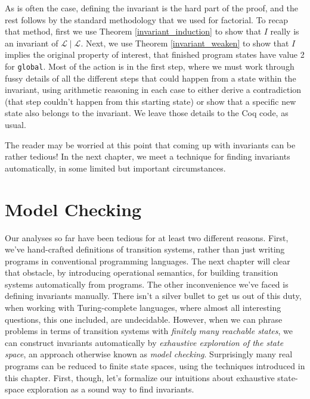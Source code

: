 \documentclass{amsbook}
\theoremstyle{definition}
\theoremstyle{remark}
\numberwithin{section}{chapter}
\numberwithin{equation}{chapter}
\begin{document}
As is often the case, defining the invariant is the hard part of the proof, and the rest follows by the standard methodology that we used for factorial.
To recap that method, first we use Theorem \ref{invariant_induction} to show that $I$ really is an invariant of $\mathcal L \mid \mathcal L$.
Next, we use Theorem \ref{invariant_weaken} to show that $I$ implies the original property of interest, that finished program states have value 2 for \texttt{global}.
Most of the action is in the first step, where we must work through fussy details of all the different steps that could happen from a state within the invariant, using arithmetic reasoning in each case to either derive a contradiction (that step couldn't happen from this starting state) or show that a specific new state also belongs to the invariant.
We leave those details to the Coq code, as usual.

The reader may be worried at this point that coming up with invariants can be rather tedious!
In the next chapter, we meet a technique for finding invariants automatically, in some limited but important circumstances.



\chapter{Model Checking}

Our analyses so far have been tedious for at least two different reasons.
First, we've hand-crafted definitions of transition systems, rather than just writing programs in conventional programming languages.
The next chapter will clear that obstacle, by introducing operational semantics, for building transition systems automatically from programs.
The other inconvenience we've faced is defining invariants manually.
There isn't a silver bullet to get us out of this duty, when working with Turing-complete languages, where almost all interesting questions, this one included, are undecidable.
However, when we can phrase problems in terms of transition systems with \emph{finitely many reachable states}, we can construct invariants automatically by \emph{exhaustive exploration of the state space}, an approach otherwise known as \emph{model checking}.
Surprisingly many real programs can be reduced to finite state spaces, using the techniques introduced in this chapter.
First, though, let's formalize our intuitions about exhaustive state-space exploration as a sound way to find invariants.
\end{document}
